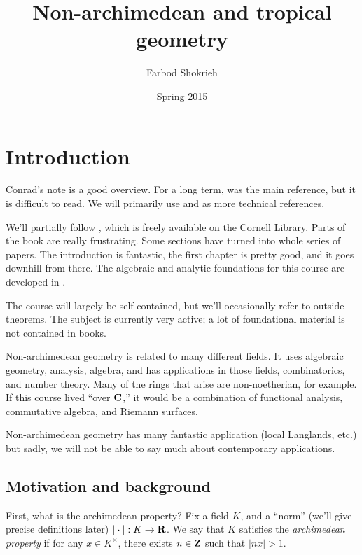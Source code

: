 \documentclass[oneside]{article}
\title{Non-archimedean and tropical geometry}
\author{Farbod Shokrieh}
\date{Spring 2015}
\begin{document}
\maketitle
\tableofcontents





\section{Introduction}

Conrad's note \cite{conrad-2008} is a good overview. For a long term, 
\cite{bgr-1984} was the main reference, but it is difficult to read. We will 
primarily use \cite{berkovich-1990} and \cite{bosch-2014} as more technical 
references. 

We'll partially follow \cite{berkovich-1990}, which is freely available on 
the Cornell Library. Parts of the book are really frustrating. Some sections 
have turned into whole series of papers. The introduction is fantastic, the 
first chapter is pretty good, and it goes downhill from there. The algebraic 
and analytic foundations for this course are developed in \cite{bgr-1984}. 

The course will largely be self-contained, but we'll occasionally refer to 
outside theorems. The subject is currently very active; a lot of foundational 
material is not contained in books. 

Non-archimedean geometry is related to many different fields. It uses 
algebraic geometry, analysis, algebra, and has applications in those fields, 
combinatorics, and number theory. Many of the rings that arise are 
non-noetherian, for example. If this course lived ``over $\mathbf{C}$,'' it would 
be a combination of functional analysis, commutative algebra, and Riemann 
surfaces. 

Non-archimedean geometry has many fantastic application (local Langlands, etc.) 
but sadly, we will not be able to say much about contemporary applications. 





\subsection{Motivation and background}

First, what is the archimedean property? Fix a field $K$, and a ``norm'' 
(we'll give precise definitions later) $|\cdot|:K\to \mathbf{R}$. We say that $K$ 
satisfies the \emph{archimedean property} if for any $x\in K^\times$, there 
exists $n\in \mathbf{Z}$ such that $|n x|>1$. 
\end{document}
